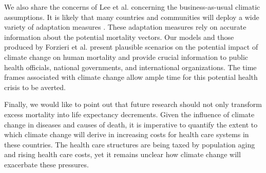 \documentclass[12pt]{article}
\begin{document}
We also share the concerns of Lee et al. \citep{lee2017comprehensive}
concerning the business-as-usual climatic assumptions. It is likely that
many countries and communities will deploy a wide variety of adaptation
measures \citep{haines2006climate, kovats2003methods, ebi2006approach}.
These adaptation measures rely on accurate information about the
potential mortality vectors. Our models and those produced by Forzieri
et al. \citep{forzieri2017increasing} present plausible scenarios on the
potential impact of climate change on human mortality and provide
crucial information to public health officials, national governments,
and international organizations. The time frames associated with climate
change allow ample time for this potential health crisis to be averted.

Finally, we would like to point out that future research should not only
transform excess mortality into life expectancy decrements. Given the
influence of climate change in diseases and causes of death, it is
imperative to quantify the extent to which climate change will derive in
increasing costs for health care systems in these countries. The health
care structures are being taxed by population aging
\citep{rechel2009can} and rising health care costs, yet it remains
unclear how climate change will exacerbate these pressures.



\end{document}
